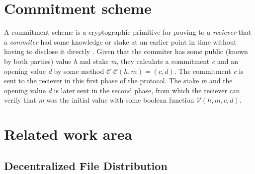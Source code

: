 \documentclass[english, biblatex, digitaloutput]{kththesis}
\begin{document}

\section{Commitment scheme}

A commitment scheme is a cryptographic primitive for proving to a \textit{reciever} that a \textit{commiter} had some knowledge or stake at an earlier point in time without having to disclose it directly \cite{rak_automated_2017}. Given that the commiter has some public (known by both parties) value \textit{h} and stake \textit{m}, they calculate a commitment \textit{c} and an opening value \textit{d} by some method $\mathcal{C}$ \ie $\mathcal{C}(h, m) = (c, d)$. The commitment \textit{c} is sent to the reciever in this first phase of the protocol. The stake \textit{m} and the opening value \textit{d} is later sent in the second phase, from which the reciever can verify that \textit{m} was the initial value with some boolean function $\mathcal{V}(h, m, c, d)$.





\section{Related work area}

\subsection{Decentralized File Distribution}
\end{document}
